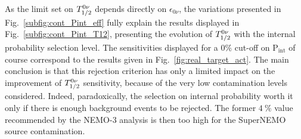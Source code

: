 As the limit set on $T_{1/2}^{0\nu}$ depends directly on $\epsilon_{0\nu}$, the variations presented in Fig.~\ref{subfig:cont_Pint_eff} fully explain the results displayed in Fig.~\ref{subfig:cont_Pint_T12}, presenting the evolution of $T_{1/2}^{0\nu}$ with the internal probability selection level.
The sensitivities displayed for a $0\%$ cut-off on P$_{\text{int}}$ of course correspond to the results given in Fig.~\ref{fig:real_target_act}.
The main conclusion is that this rejection criterion has only a limited impact on the improvement of $T_{1/2}^{0\nu}$ sensitivity, because of the very low contamination levels considered.
Indeed, paradoxically, the selection on internal probability worth it only if there is enough background events to be rejected.
The former $4~\%$ value recommended by the NEMO-$3$ analysis is then too high for the SuperNEMO source contamination.


